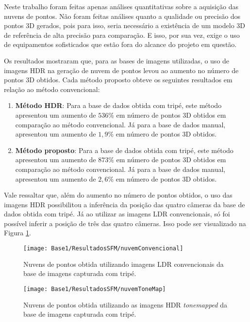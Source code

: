 Neste trabalho foram feitas apenas análises quantitativas sobre a aquisição das nuvens de pontos. Não foram feitas análises quanto a qualidade ou precisão dos pontos 3D gerados, pois para isso, seria necessário a existência de um modelo 3D de referência de alta precisão para comparação. E isso, por sua vez, exige o uso de equipamentos sofisticados que estão fora do alcance do projeto em questão.

Os resultados mostraram que, para as bases de imagens utilizadas, o uso de imagens HDR na geração de nuvem de pontos levou ao aumento no número de pontos 3D obtidos. Cada método proposto obteve os seguintes resultados em relação ao método convencional:

\begin{enumerate}
\item \textbf{Método HDR}: Para a base de dados obtida com tripé, este método apresentou um aumento de $536\%$ em número de pontos 3D obtidos em comparação ao método convencional. Já para a base de dados manual, apresentou um aumento de $1,9\%$ em número de pontos 3D obtidos.

\item \textbf{Método proposto}: Para a base de dados obtida com tripé, este método apresentou um aumento de $873\%$ em número de pontos 3D obtidos em comparação ao método convencional. Já para a base de dados manual, apresentou um aumento de $2,6\%$ em número de pontos 3D obtidos.
\end{enumerate}

Vale ressaltar que, além do aumento no número de pontos obtidos, o uso das imagens HDR possibilitou a inferência da posição das quatro câmeras da base de dados obtida com tripé. Já ao utilizar as imagens LDR convencionais, só foi possível inferir a posição de três das quatro câmeras. Isso pode ser visualizado na Figura \ref{figNuvemPontosA}.

\begin{figure}[H]
  \centering 
  \texttt{[image: Base1/ResultadosSFM/nuvemConvencional]} 
  \caption{Nuvens de pontos obtida utilizando imagens LDR convencionais da base de imagens capturada com tripé.}
  \label{figNuvemPontosA}
\end{figure}

\begin{figure}[H]
  \centering 
  \texttt{[image: Base1/ResultadosSFM/nuvemToneMap]}
  \caption{Nuvens de pontos obtida utilizando as imagens HDR \textit{tonemapped} da base de imagens capturada com tripé.}
  \label{figNuvemPontosB}
\end{figure}

